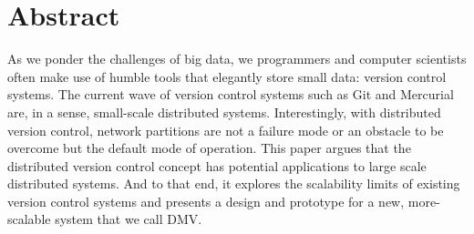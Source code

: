 \chapter{Abstract}


As we ponder the challenges of big data, we programmers and computer scientists
often make use of humble tools that elegantly store small data: version control
systems. The current wave of version control systems such as Git and Mercurial
are, in a sense, small-scale distributed systems. Interestingly, with
distributed version control, network partitions are not a failure mode or an
obstacle to be overcome but the default mode of operation. This paper argues
that the distributed version control concept has potential applications to large
scale distributed systems. And to that end, it explores the scalability limits
of existing version control systems and presents a design and prototype for a
new, more-scalable system that we call \gls{DMV}.
